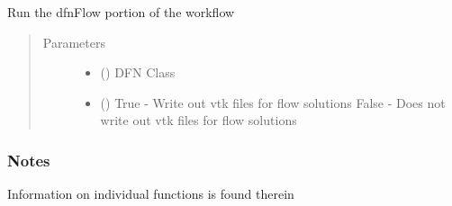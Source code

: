 \documentclass[letterpaper,10pt,english]{sphinxmanual}
\begin{document}

\begin{fulllineitems}
\label{\detokenize{pydfnworks:pydfnworks.dfnFlow.flow.dfn_flow}}
Run the dfnFlow portion of the workflow
\begin{quote}\begin{description}
\item[{Parameters}] \leavevmode\begin{itemize}
\item {} 
 () \textendash{} DFN Class

\item {} 
 () \textendash{} True - Write out vtk files for flow solutions
False  - Does not write out vtk files for flow solutions

\end{itemize}

\end{description}\end{quote}
\subsubsection*{Notes}

Information on individual functions is found therein

\end{fulllineitems}

\end{document}
